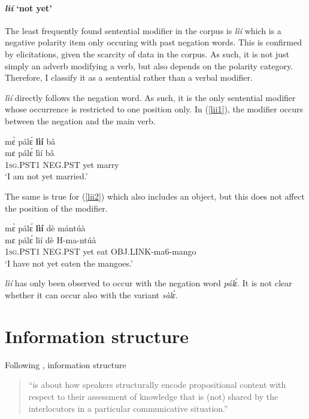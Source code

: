 \paragraph{{\itshape lìí} `not yet'}

The least frequently found sentential modifier in the corpus is {\itshape lìí} which is a negative polarity item only occuring with past negation words. This is confirmed by elicitations, given the scarcity of data in the corpus. As such, it is not just simply an adverb modifying a verb, but also depends on the polarity category. Therefore, I classify it as a sentential rather than a verbal modifier.

{\itshape lìí} directly follows the negation word. As such, it is the only sentential modifier whose occurrence is restricted to one position only. In (\ref{lii1}), the modifier occurs between the negation and the main verb.

\begin{exe} 
\ex\label{lii1}
  \glll  mɛ̀ pálɛ́ {\bfseries lìí} bâ \\
          mɛ pálɛ́ lìí bâ \\
           1\textsc{sg}.PST1 NEG.PST yet marry \\
    \trans `I am not yet married.'
\end{exe}

\noindent The same is true for (\ref{lii2}) which also includes an object, but this does not affect the position of the modifier.

\begin{exe} 
\ex\label{lii2}
  \glll  mɛ̀ pálɛ́ {\bfseries lìí} dè mántúà \\
          mɛ pálɛ́ lìí dè H-ma-ntúà \\
           1\textsc{sg}.PST1 NEG.PST yet eat OBJ.LINK-ma6-mango \\
    \trans `I have not yet eaten the mangoes.'
\end{exe}

{\itshape lìí} has only been observed to occur with the negation word {\itshape pálɛ́}. It is not clear whether it can occur also with the variant {\itshape sàlɛ́}.



\section{Information structure}
\label{sec:IS}

Following \citet[156]{guldemann2015}, information structure 
\begin{quote}
``is about how speakers structurally encode propositional content with respect to their assessment of knowledge that is (not) shared by the interlocutors in a particular communicative situation.''
\end{quote}


